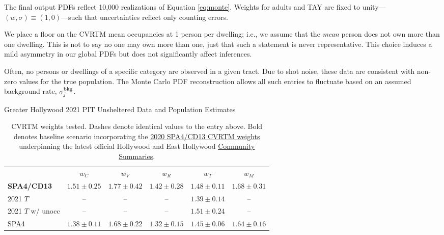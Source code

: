 \documentclass[11pt,twocolumn]{article}
\begin{document}
The final output PDFs reflect 10,000 realizations of Equation \ref{eq:monte}. Weights for 
adults and TAY are fixed to unity---$(w,\sigma)\equiv(1,0)$---such that uncertainties reflect only 
counting errors. 


We place a floor on the CVRTM mean occupancies at 1 person per dwelling; i.e., we assume that the 
{\it mean} person does not own more than one dwelling. This is not to say no one may own more than 
one, just that such a statement is never representative. This choice induces a mild asymmetry in our 
global PDFs but does not significantly affect inferences.

Often, no persons or dwellings of a specific category are observed in a given tract. Due to shot 
noise, these data are consistent with non-zero values for the true population. The Monte Carlo 
PDF reconstruction allows all such entries to fluctuate based on an assumed background rate,
$\sigma_{j}^{\rm bkg}$. 

\begin{table}[t]
\centering
\caption{Greater Hollywood 2021 PIT Unsheltered Data and Population Estimates}
\begin{tabular}{lccccc}
\toprule
 & $w_{C}$ & $w_{V}$ & $w_{R}$ & $w_{T}$ & $w_{M}$ \\ \cmidrule{1-6}
{\bf SPA4/CD13} & $1.51\pm0.25$ & $1.77\pm0.42$ & $1.42\pm0.28$ & $1.48\pm0.11$ & $1.68\pm0.31$ \\
2021 $T$ & -- & -- & -- & $1.39\pm0.14$ & --\\
2021 $T$ w/ unocc & -- & -- & --& $1.51\pm0.24$ & --\\
SPA4 & $1.38\pm0.11$ & $1.68\pm0.22$ & $1.32\pm0.15$ & $1.45\pm0.06$ & $1.64\pm0.16$\\
\bottomrule
\end{tabular}
\caption*{CVRTM weights tested. Dashes denote identical values to the entry above. Bold denotes 
baseline scenario incorporating the 
\href{https://www.lahsa.org/documents?id=4635-usc-2018-2020-multipliers-and-estimates-overview}
{2020 SPA4/CD13 CVRTM weights} underpinning the latest official Hollywood and East Hollywood 
\href{https://www.lahsa.org/documents?id=4686-2020-greater-los-angeles-city-community-homelessness-report-service-planning-area-4.pdf}{Community Summaries}.}
\label{tbl:weights}
\end{table}
\end{document}
